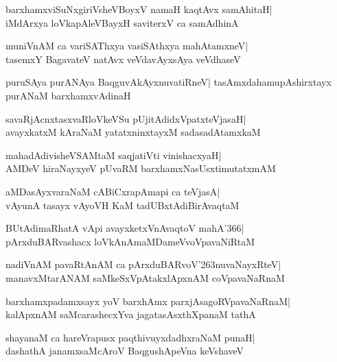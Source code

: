 \documentclass[twoside,12pt,openright]{book}
\def\S{\char'263}
\newcounter{shloka}[chapter]
\begin{document}
\begin{shloka}%
barxhamxviSuNxgiriVsheVBoyxV namaH kaqtAvx samAhitaH|\\
iMdArxya loVkapAleVBayxH saviterxV ca samAdhinA
\end{shloka}

\begin{shloka}%
muniVnAM ca variSAThxya vasiSAthxya mahAtamxneV|\\
tasemxY BagavateV natAvx veVdavAyxsAya veVdhaseV
\end{shloka}

\begin{shloka}%
puruSAya purANAya BaqguvAkAyxnuvatiRneV|
tasAmxdahamupAshirxtayx purANaM barxhamxvAdinaH
\end{shloka}

\begin{shloka}%
savaRjAcnxtasxvaRloVkeVSu pUjitAdidxVpatxteVjasaH|\\
avayxkatxM kAraNaM yatatxninxtayxM sadasadAtamxkaM
\end{shloka}

\begin{shloka}%
mahadAdivisheVSAMtaM saqjatiVti vinishacxyaH|\\
AMDeV hiraNayxyeV pUvaRM barxhamxNasUsxtimutatxmAM
\end{shloka}

\begin{shloka}%
aMDasAyxvaraNaM cABiCxrapAmapi ca teVjasA|\\
vAyunA tasayx vAyoVH KaM tadUBxtAdiBirAvaqtaM
\end{shloka}

\begin{shloka}%
BUtAdimaRhatA vApi avayxketxVnAvaqtoV mahA\char'366|\\
pArxduBARvashacx loVkAnAmaMDameVvoVpavaNiRtaM
\end{shloka}

\begin{shloka}%
nadiVnAM pavaRtAnAM ca pArxduBARvoV\S nuvaNayxRteV|\\
manavxMtarANAM saMkeSxVpAtakxlApxnAM coVpavaNaRnaM
\end{shloka}

\begin{shloka}%
barxhamxpadamxsayx yoV barxhAmx parxjAsagoRVpavaNaRnaM|\\
kalApxnAM saMcarashecxYva jagatasAsxthXpanaM tathA
\end{shloka}

\begin{shloka}%
shayanaM ca hareVrapusx paqthivuyxdadhxraNaM punaH|\\
dashathA janamxsaMcAroV BaqgushApeVna keVshaveV
\end{shloka}
\end{document}
